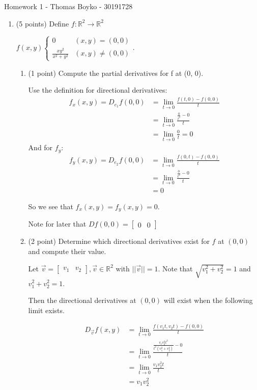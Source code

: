 \documentclass{article}
\begin{document}
    \huge Homework 1 - Thomas Boyko - 30191728

    \normalsize
\begin{enumerate} 

\item (5 points) Define $f : \mathbb{R}^2 \to \mathbb{R}^2$

$f(x,y)\begin{cases}0&(x,y)=(0,0)\\\frac{xy^2}{x^2+y^2}&(x,y)\neq(0,0)\end{cases}.$

\begin{enumerate}[label= (\alph*)] 
\item (1 point) Compute the partial derivatives for f at (0, 0).

Use the definition for directional derivatives:
\begin{align*} 
f_x(x,y)=D_{e_1}f(0,0)&=\lim_{t\to0}\frac{f(t,0)-f(0,0)}{t}\\
&=\lim_{t\to0}\frac{\frac{0}{t^2}-0}{t}\\
&=\lim_{t\to0}\frac{0}{t}=0
\end{align*}
And for $f_y$:
\begin{align*} 
f_y(x,y)=D_{e_2}f(0,0)&=\lim_{t\to0}\frac{f(0,t)-f(0,0)}{t}\\
&=\lim_{t\to0}\frac{\frac{0}{t^2}-0}{t}\\
&=0
\end{align*}

So we see that $f_x(x,y)=f_y(x,y)=0$.

Note for later that $Df(0,0)=\begin{bmatrix} 0&0 \end{bmatrix}$

\item (2 point) Determine which directional derivatives exist for $f$ at $(0, 0)$ and compute
their value.

Let $\vec v = \begin{bmatrix} v_1&v_2 \end{bmatrix}, \vec v \in \mathbb{R}^2$ with $||\vec v||=1 $. Note that $\sqrt{v_1^2+v_2^2}=1$ and $v_1^2+v_2^2=1$.

Then the directional derivatives at $(0,0)$ will exist when the following limit exists.

\begin{align*} 
D_{\vec v}f(x,y)&= \lim_{t\to0}\frac{f(v_1t,v_2t) - f(0,0)}{t}\\
&=\lim_{t\to0}\frac{\frac{v_1v_2^2t^3}{t^2(v_1^2+v_2^2)}-0}{t}\\
&=\lim_{t\to0}\frac{v_1v_2^2t}{t}\\
&=v_1v_2^2
\end{align*}


\end{enumerate}
\end{enumerate}
\end{document}
